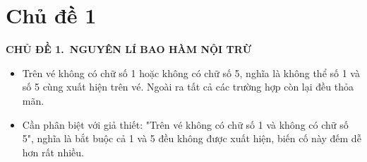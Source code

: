 \documentclass[12pt, a4paper]{article}
\begin{document}
	\section*{Chủ đề 1}\label{sec:chu-e-1}
		\begin{tcolorbox}[colback=headerbg, colframe=headerborder, arc=3mm, boxrule=1.5pt, halign=center]
		\textbf{\Large CHỦ ĐỀ 1.\ NGUYÊN LÍ BAO HÀM NỘI TRỪ}
	\end{tcolorbox}	
	\vspace{0.5cm}
	
	\noindent{}	
	\vspace{0.3cm}	
	
	\begin{itemize}[leftmargin=*]
		\item Trên vé không có chữ số 1 hoặc không có chữ số 5, nghĩa là không thể số 1 và số 5 cùng xuất hiện trên vé. Ngoài ra tất cả các trường hợp còn lại đều thỏa mãn.
		\item Cần phân biệt với giả thiết: "Trên vé không có chữ số 1 và không có chữ số 5", nghĩa là bắt buộc cả 1 và 5 đều không được xuất hiện, biến cố này đếm dễ hơn rất nhiều.
	\end{itemize}		
	
\end{document}
